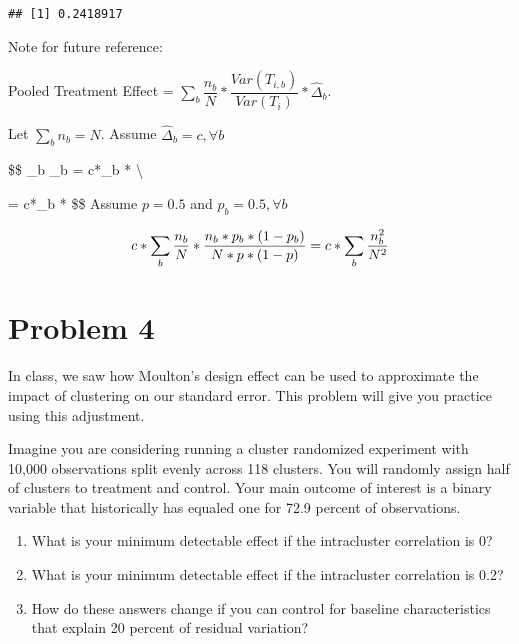 \documentclass[
]{article}
\newenvironment{Shaded}{\begin{snugshade}}{\end{snugshade}}
\newcommand{\CommentTok}[1]{\textcolor[rgb]{0.56,0.35,0.01}{\textit{#1}}}
\newcommand{\FunctionTok}[1]{\textcolor[rgb]{0.00,0.00,0.00}{#1}}
\newcommand{\NormalTok}[1]{#1}
\newcommand{\SpecialCharTok}[1]{\textcolor[rgb]{0.00,0.00,0.00}{#1}}
\begin{document}
\begin{Shaded}
\end{Shaded}

\begin{verbatim}
## [1] 0.2418917
\end{verbatim}

Note for future reference:

Pooled Treatment Effect =
\(\sum_b \dfrac{n_b}{N}*\dfrac{Var(T_{i,b})}{Var(T_i)}*\hat{\Delta}_b\).

Let \(\sum_b n_b = N\). Assume \(\hat{\Delta}_b = c, \forall b\)

\$\$ \sum\_b
\emph{}\hat{\Delta}\_b =
c*\sum\_b * \textbackslash{}

= c*\sum\_b * \$\$
Assume \(p = 0.5\) and \(p_b = 0.5, \forall b\)

\[
c*\sum_b \dfrac{n_b}{N}*\dfrac{n_b*p_b*(1-p_b)}{N*p*(1-p)} = c*\sum_b \dfrac{n_b^2}{N^2} \\
\]

\newpage

\hypertarget{problem-4}{%
\section{Problem 4}\label{problem-4}}

In class, we saw how Moulton's design effect can be used to approximate
the impact of clustering on our standard error. This problem will give
you practice using this adjustment.

Imagine you are considering running a cluster randomized experiment with
10,000 observations split evenly across 118 clusters. You will randomly
assign half of clusters to treatment and control. Your main outcome of
interest is a binary variable that historically has equaled one for 72.9
percent of observations.

\begin{enumerate}
\def\labelenumi{\arabic{enumi}.}
\item
  What is your minimum detectable effect if the intracluster correlation
  is 0?
\item
  What is your minimum detectable effect if the intracluster correlation
  is 0.2?
\item
  How do these answers change if you can control for baseline
  characteristics that explain 20 percent of residual variation?
\end{enumerate}
\end{document}
